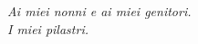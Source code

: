 \vspace{17cm}

\begin{flushright}
\Large
\itshape{Ai miei nonni e ai miei genitori.\\I miei pilastri.}
\end{flushright}
